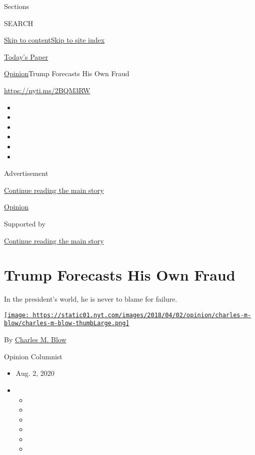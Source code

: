 Sections

SEARCH

\protect\hyperlink{site-content}{Skip to
content}\protect\hyperlink{site-index}{Skip to site index}

\href{https://myaccount.nytimes.com/auth/login?response_type=cookie\&client_id=vi}{}

\href{https://www.nytimes.com/section/todayspaper}{Today's Paper}

\href{/section/opinion}{Opinion}\textbar{}Trump Forecasts His Own Fraud

\href{https://nyti.ms/2BQM3RW}{https://nyti.ms/2BQM3RW}

\begin{itemize}
\item
\item
\item
\item
\item
\item
\end{itemize}

Advertisement

\protect\hyperlink{after-top}{Continue reading the main story}

\href{/section/opinion}{Opinion}

Supported by

\protect\hyperlink{after-sponsor}{Continue reading the main story}

\hypertarget{trump-forecasts-his-own-fraud}{%
\section{Trump Forecasts His Own
Fraud}\label{trump-forecasts-his-own-fraud}}

In the president's world, he is never to blame for failure.

\href{https://www.nytimes.com/by/charles-m-blow}{\texttt{[image: https://static01.nyt.com/images/2018/04/02/opinion/charles-m-blow/charles-m-blow-thumbLarge.png]}}

By \href{https://www.nytimes.com/by/charles-m-blow}{Charles M. Blow}

Opinion Columnist

\begin{itemize}
\item
  Aug. 2, 2020
\item
  \begin{itemize}
  \item
  \item
  \item
  \item
  \item
  \item
  \end{itemize}
\end{itemize}

